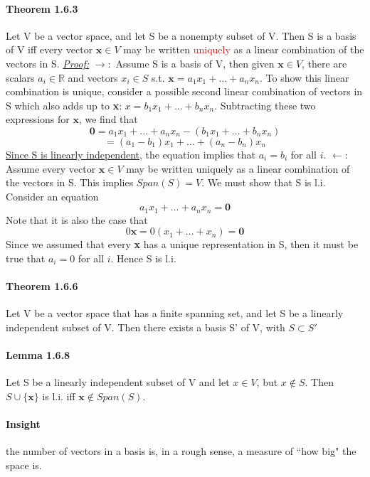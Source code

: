 \documentclass[11pt]{article}
\newcommand{\ti}[1]{\textit{#1}}
\newcommand{\tb}[1]{\textbf{#1}}
\newcommand{\mb}[1]{\mathbb{#1}}
\newcommand{\under}[1]{\underline{#1}}
\begin{document}
	\paragraph{Theorem 1.6.3} Let V be a vector space, and let S be a nonempty subset of V. Then S is a basis of V iff every vector $\tb{x} \in V$ may be written \textcolor{red}{uniquely} as a linear combination of the vectors in S. \newline
	\under{\ti{Proof:}}
	$\rightarrow:$ Assume  S is a basis of V, then given $\tb{x} \in V$, there are scalars $a_i \in \mb{R}$ and vectors $x_i \in S$ s.t. $\tb{x} = a_1x_1 + ... + a_nx_n$. To show this linear combination is unique, consider a possible second linear combination of vectors in S which also adds up to \tb{x}: $x= b_1x_1 + ...+b_nx_n$. Subtracting these two expressions for $\tb{x}$, we find that
	$$\tb{0} = a_1x_1 + ... + a_nx_n - (b_1x_1 + ...+b_nx_n)$$ 
	$$=(a_1 - b_1)x_1 + ...+(a_n-b_n)x_n$$
	\under{Since S is linearly independent}, the equation implies that $a_i = b_i$ for all $i$.\newline\newline
	$\leftarrow$: Assume every vector $\tb{x} \in V$ may be written uniquely as a linear combination of the vectors in S. This implies $Span(S) = V$. We must show that S is l.i. Consider an equation
	$$a_1x_1 +...+a_nx_n = \tb{0}$$
	Note that it is also the case that
	$$0\tb{x} = 0(x_1 + ...+x_n) = \tb{0}$$
	Since we assumed that every \tb{x} has a unique representation in S, then it must be true that $a_i = 0$ for all $i$. Hence S is l.i.
 	\paragraph{Theorem 1.6.6} Let V be a vector space that has a finite spanning set, and let S be a linearly independent subset of V. Then there exists a basis S' of V, with $S \subset S'$
	\paragraph{Lemma 1.6.8} Let S be a linearly independent subset of V and let $x \in V$, but $x \notin S$. Then $S \cup \{\tb{x}\}$ is l.i. iff $\tb{x} \notin Span(S)$.
	\paragraph{Insight} the number of vectors in a basis is, in a rough sense, a measure of ``how big" the space is.
\end{document}
